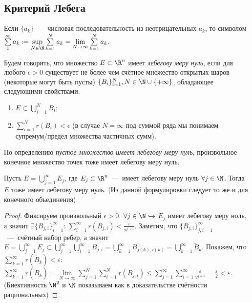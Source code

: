 
\subsection{Критерий Лебега}
\begin{definition}
     Если $\{a_k\}$~---~числовая последовательность из неотрицательных $a_k$, то символом $\sum\limits_{1}^{\infty}a_k := \sup\limits_{N \in \N} \sum\limits_{k = 1}^N a_k = \lim\limits_{N \rightarrow \infty} \sum\limits_{k = 1}^N a_k$.
\end{definition}
\begin{definition}
    Будем говорить, что множество $E \subset \R^n$ имеет \textit{лебегову меру нуль}, если для любого $\epsilon > 0$ существует не более чем счётное множество открытых шаров (некоторые могут быть пусты) $\{B_i\}_{i = 1}^{N}, N \in \N \cup \{+\infty\}$, обладающее следующими свойствами:
    \begin{enumerate}
        \item $E \subset \bigcup\limits_{i = 1}^{N} B_i$;
        \item $\sum\limits_{i = 1}^{N} r(B_i) < \epsilon$ (в случае $N = \infty$ под суммой ряда мы понимаем супремум/предел множества частичных сумм).
    \end{enumerate}
\end{definition}

\begin{note}
    По определению \textit{пустое множество имеет лебегову меру нуль}, произвольное конечное множество точек тоже имеет лебегову меру нуль.
\end{note}

\begin{lemma}
    Пусть $E = \bigcup\limits_{j = 1}^{\infty} E_j$, где $E_j \subset \R^n$~---~имеет лебегову меру нуль $\forall j \in \N$. Тогда $E$ тоже имеет лебегову меру нуль. (Из данной формулировки следует то же и для конечного объединения)
\end{lemma}
\begin{proof}
    Фиксируем произвольный $\epsilon > 0$. $\forall j \in \N \hookrightarrow$
    $E_j$ имеет лебегову меру ноль, а значит $\exists \{B_{j,i}\}_{i = 1}^{\infty}$: $\sum\limits_{i = 1}^{\infty} r(B_{j,i}) < \frac{\varepsilon}{2^{j + 1}}$. Заметим, что $\{B_{j, i}\}_{j, i = 1}^{\infty}$~---~счётный набор ребер, а значит $E = \bigcup\limits_{j = 1}^{\infty} E_j \subset \bigcup\limits_{j = 1}^{\infty}\bigcup\limits_{i = 1}^{\infty} B_{j, i} = \bigcup\limits_{k = 1}^{\infty} B_{j(k), i(k)} = \bigcup\limits_{k = 1}^{\infty} \widetilde{B}_k$.
    Покажем, что $\sum\limits_{k = 1}^{\infty} r(\widetilde{B}_k) < \varepsilon$: $\sum\limits_{k = 1}^{\infty} r(\widetilde{B}_k) = \lim\limits_{N \rightarrow \infty} \sum\limits_{j = 1}^{N}\sum\limits_{i = 1}^{N} r(B_{j, i}) \leq \sum\limits_{j = 1}^{\infty}\sum\limits_{i = 1}^{\infty} \frac{\varepsilon}{2^{j + 1}} = \frac{\varepsilon}{2} < \varepsilon$. (Биективность $\N^2$ и $\N$ показываем как в доказательстве счётности рациональных)
\end{proof}

